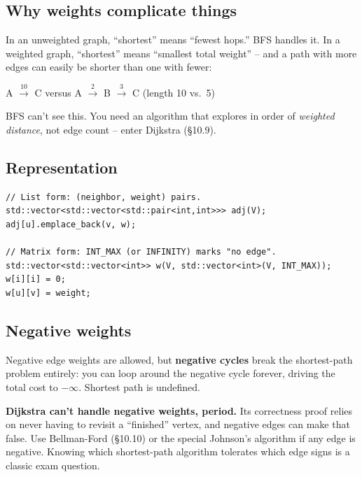 \documentclass[11pt]{article}
\begin{document}
\subsection*{Why weights complicate things}

In an unweighted graph, ``shortest'' means ``fewest hops.'' BFS handles it. In a weighted graph, ``shortest'' means ``smallest total weight'' -- and a path with more edges can easily be shorter than one with fewer:

\begin{center}
A $\xrightarrow{10}$ C versus A $\xrightarrow{2}$ B $\xrightarrow{3}$ C  \quad (length 10 vs.\ 5)
\end{center}

BFS can't see this. You need an algorithm that explores in order of \emph{weighted distance}, not edge count -- enter Dijkstra (§10.9).

\subsection*{Representation}

\begin{lstlisting}[basicstyle=\ttfamily\small,frame=single]
// List form: (neighbor, weight) pairs.
std::vector<std::vector<std::pair<int,int>>> adj(V);
adj[u].emplace_back(v, w);

// Matrix form: INT_MAX (or INFINITY) marks "no edge".
std::vector<std::vector<int>> w(V, std::vector<int>(V, INT_MAX));
w[i][i] = 0;
w[u][v] = weight;
\end{lstlisting}

\subsection*{Negative weights}

Negative edge weights are allowed, but \textbf{negative cycles} break the shortest-path problem entirely: you can loop around the negative cycle forever, driving the total cost to $-\infty$. Shortest path is undefined.

\begin{warnbox}
\textbf{Dijkstra can't handle negative weights, period.} Its correctness proof relies on never having to revisit a ``finished'' vertex, and negative edges can make that false. Use Bellman-Ford (§10.10) or the special Johnson's algorithm if any edge is negative. Knowing which shortest-path algorithm tolerates which edge signs is a classic exam question.
\end{warnbox}
\end{document}
